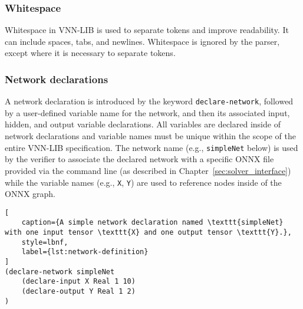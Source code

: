 \subsubsection*{Whitespace}
Whitespace in VNN-LIB is used to separate tokens and improve readability. It can include spaces, tabs, and newlines. Whitespace is ignored by the parser, except where it is necessary to separate tokens.

\subsubsection*{Network declarations}
A network declaration is introduced by the keyword \texttt{declare-network}, followed by a user-defined variable name for the network, 
and then its associated input, hidden, and output variable declarations. All variables are declared inside of network declarations and variable 
names must be unique within the scope of the entire VNN-LIB specification.  The network name (e.g., \texttt{simpleNet} below) is used by the verifier to 
associate the declared network with a specific ONNX file provided via the command line (as described in Chapter~\ref{sec:solver_interface}) while the variable names 
(e.g., \texttt{X}, \texttt{Y}) are used to reference nodes inside of the ONNX graph.

\begin{lstlisting}[
    caption={A simple network declaration named \texttt{simpleNet} with one input tensor \texttt{X} and one output tensor \texttt{Y}.}, 
    style=lbnf,
    label={lst:network-definition}
]
(declare-network simpleNet
    (declare-input X Real 1 10)
    (declare-output Y Real 1 2)
) 
\end{lstlisting}


